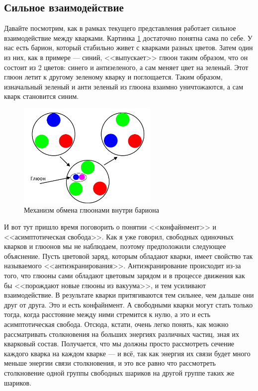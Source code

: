 \documentclass[12pt]{article}
\begin{document}
\subsection{Сильное взаимодействие}
Давайте посмотрим, как в рамках текущего представления работает сильное взаимодействие между кварками. Картинка \ref{fig:sem_11_quark} достаточно понятна сама по себе. У нас есть барион, который стабильно живет с кварками разных цветов. Затем один из них, как в примере --- синий, <<выпускает>> глюон таким образом, что он состоит из 2 цветов: синего и антизеленого, а сам меняет цвет на зеленый. Этот глюон летит к другому зеленому кварку и поглощается. Таким образом, изначальный зеленый и анти зеленый из глюона взаимно уничтожаются, а сам кварк становится синим.
\begin{figure}[h]
    \centering
    \includegraphics[width=0.6\textwidth,height=\textheight,keepaspectratio]{Seminar_11-12/pics/pic_02_stong.pdf}
    \caption{Механизм обмена глюонами внутри бариона}
    \label{fig:sem_11_quark}
\end{figure}

И вот тут пришло время поговорить о понятии <<конфайнмент>> и <<асимптотическая свобода>>. Как я уже говорил, свободных одиночных кварков и глюонов мы не наблюдаем, поэтому предположили следующее объяснение. Пусть цветовой заряд, которым обладают кварки, имеет свойство так называемого <<антиэкранирования>>. Антиэкранирование происходит из-за того, что глюоны сами обладают цветовым зарядом и в процессе движения как бы <<порождают новые глюоны из вакуума>>, и тем усиливают взаимодействие. В результате кварки притягиваются тем сильнее, чем дальше они друг от друга. Это и есть конфайнмент. А свободными кварки могут стать только тогда, когда расстояние между ними стремится к нулю, а это и есть асимптотическая свобода. Отсюда, кстати, очень легко понять, как можно рассматривать столкновения на больших энергиях различных частиц, зная их кварковый состав. Получается, что мы должны просто рассмотреть сечение каждого кварка на каждом кварке --- и всё, так как энергия их связи будет много меньше энергии связи столкновения, и это все равно что рассмотреть столкновение одной группы  свободных шариков на другой группе таких же шариков.
\end{document}
